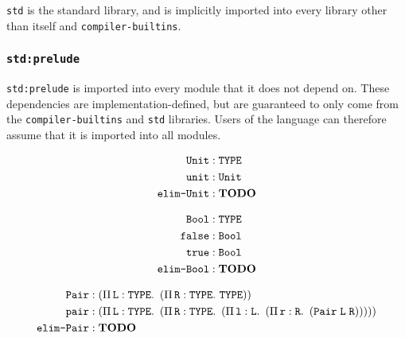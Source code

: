 \texttt{std} is the standard library, and is implicitly imported into every library other than itself and \texttt{compiler-builtins}.

\subsubsection{\texttt{std:prelude}}
\texttt{std:prelude} is imported into every module that it does not depend on.
These dependencies are implementation-defined, but are guaranteed to only come from the \texttt{compiler-builtins} and \texttt{std} libraries.
Users of the language can therefore assume that it is imported into all modules.

\begin{align}
	\texttt{Unit} & : \texttt{TYPE} \\
	\texttt{unit} & : \texttt{Unit} \\
	\texttt{elim-Unit} & : \textbf{TODO}
\end{align}

\begin{align}
	\texttt{Bool} & : \texttt{TYPE} \\
	\texttt{false} & : \texttt{Bool} \\
	\texttt{true} & : \texttt{Bool} \\
	\texttt{elim-Bool} & : \textbf{TODO}
\end{align}

\begin{align}
	\texttt{Pair} & : \left(\Pi\,\mathit{\texttt{L}}:\texttt{TYPE}.\ \left(\Pi\,\mathit{\texttt{R}}:\texttt{TYPE}.\ \texttt{TYPE}\right)\right) \\
	\texttt{pair} & : \left(\Pi\,\mathit{\texttt{L}}:\texttt{TYPE}.\ \left(\Pi\,\mathit{\texttt{R}}:\texttt{TYPE}.\ \left(\Pi\,\mathit{\texttt{l}}:\texttt{L}.\ \left(\Pi\,\mathit{\texttt{r}}:\texttt{R}.\ \left(\texttt{Pair}\;\texttt{L}\;\texttt{R}\right)\right)\right)\right)\right) \\
	\texttt{elim-Pair} & : \textbf{TODO}
\end{align}
